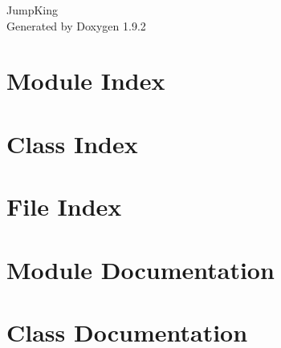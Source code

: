 \documentclass[twoside]{book}
\newcommand{\+}{\discretionary{\mbox{\scriptsize$\hookleftarrow$}}{}{}}
\newcommand{\clearemptydoublepage}{%
    \newpage{\pagestyle{empty}\cleardoublepage}%
  }
\begin{document}
  \raggedbottom
    \hypersetup{pageanchor=false,
                bookmarksnumbered=true,
                pdfencoding=unicode
               }
  \begin{titlepage}
  \vspace*{7cm}
  \begin{center}%
  {\Large Jump\+King}\\
  \vspace*{1cm}
  {\large Generated by Doxygen 1.9.2}\\
  \end{center}
  \end{titlepage}
  \clearemptydoublepage
  \tableofcontents
  \clearemptydoublepage
  \hypersetup{pageanchor=true}
\chapter{Module Index}

\chapter{Class Index}

\chapter{File Index}

\chapter{Module Documentation}


\chapter{Class Documentation}







\end{document}

